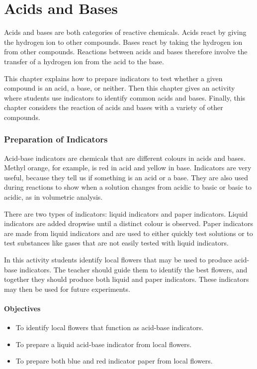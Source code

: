 \chapter{Acids and Bases}

Acids and bases are both categories of reactive chemicals. Acids react by giving the hydrogen ion to other compounds. Bases react by taking the hydrogen ion from other compounds. Reactions between acids and bases therefore involve the transfer of a hydrogen ion from the acid to the base.

This chapter explains how to prepare indicators to test whether a given compound is an acid, a base, or neither. Then this chapter gives an activity where students use indicators to identify common acids and bases. Finally, this chapter considers the reaction of acids and bases with a variety of other compounds.

\subsection{Preparation of Indicators}

Acid-base indicators are chemicals that are different colours in acids and bases. Methyl orange, for example, is red in acid and yellow in base. Indicators are very useful, because they tell us if something is an acid or a base. They are also used during reactions to show when a solution changes from acidic to basic or basic to acidic, as in volumetric analysis.

There are two types of indicators: liquid indicators and paper indicators. Liquid indicators are added dropwise until a distinct colour is observed. Paper indicators are made from liquid indicators and are used to either quickly test solutions or to test substances like gases that are not easily tested with liquid indicators.

In this activity students identify local flowers that may be used to produce acid-base indicators. The teacher should guide them to identify the best flowers, and together they should produce both liquid and paper indicators. These indicators may then be used for future experiments.

\subsubsection*{Objectives}
\begin{itemize}
\item{To identify local flowers that function as acid-base indicators.}
\item{To prepare a liquid acid-base indicator from local flowers.}
\item{To prepare both blue and red indicator paper from local flowers.}
\end{itemize}

